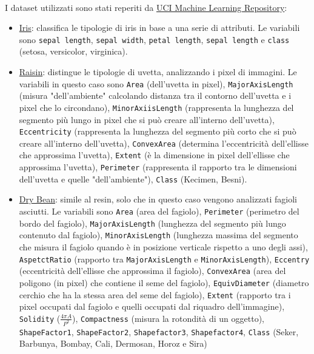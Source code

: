 \documentclass{article}
\begin{document}
\\
I dataset utilizzati sono stati reperiti da \href{https://archive.ics.uci.edu/}{UCI Machine Learning Repository}:
\begin{itemize}
	\item \href{https://archive.ics.uci.edu/dataset/53/iris}{Iris}: classifica le tipologie di iris in base a una serie di attributi. Le variabili sono \texttt{sepal length}, \texttt{sepal width}, \texttt{petal length}, \texttt{sepal length} e \texttt{class} (setosa, versicolor, virginica).
	\item \href{https://archive.ics.uci.edu/dataset/850/raisin}{Raisin}: distingue le tipologie di uvetta, analizzando i pixel di immagini. Le variabili in questo caso sono \texttt{Area} (dell'uvetta in pixel), \texttt{MajorAxisLength} (misura "dell'ambiente" calcolando distanza tra il contorno dell'uvetta e i pixel che lo circondano), \texttt{MinorAxiisLength} (rappresenta la lunghezza del segmento più lungo in pixel che si può creare all'interno dell'uvetta), \texttt{Eccentricity} (rappresenta la lunghezza del segmento più corto che si può creare all'interno dell'uvetta), \texttt{ConvexArea} (determina l'eccentricità dell'ellisse che approssima l'uvetta), \texttt{Extent} (è la dimensione in pixel dell'ellisse che approssima l'uvetta), \texttt{Perimeter} (rappresenta il rapporto tra le dimensioni dell'uvetta e quelle "dell'ambiente"), \texttt{Class} (Kecimen, Besni).
	\item \href{https://archive.ics.uci.edu/dataset/602/dry+bean+dataset}{Dry Bean}: simile al resin, solo che in questo caso vengono analizzati fagioli asciutti. Le variabili sono \texttt{Area} (area del fagiolo), \texttt{Perimeter} (perimetro del bordo del fagiolo), \texttt{MajorAxisLength} (lunghezza del segmento più lungo contenuto dal fagiolo), \texttt{MinorAxisLength} (lunghezza massima del segmento che misura il fagiolo quando è in posizione verticale rispetto a uno degli assi), \texttt{AspetctRatio} (rapporto tra \texttt{MajorAxisLength} e \texttt{MinorAxisLength}), \texttt{Eccentry} (eccentricità dell'ellisse che approssima il fagiolo), \texttt{ConvexArea} (area del poligono (in pixel) che contiene il seme del fagiolo), \texttt{EquivDiameter} (diametro cerchio che ha la stessa area del seme del fagiolo), \texttt{Extent} (rapporto tra i pixel occupati dal fagiolo e quelli occupati dal riquadro dell'immagine), \texttt{Solidity} ($\frac{4\pi A}{P^2}$), \texttt{Compactness} (misura la rotondità di un oggetto), \texttt{ShapeFactor1}, \texttt{ShapeFactor2}, \texttt{Shapefactor3}, \texttt{Shapefactor4}, \texttt{Class} (Seker, Barbunya, Bombay, Cali, Dermosan, Horoz e Sira)
\end{itemize}
\end{document}

